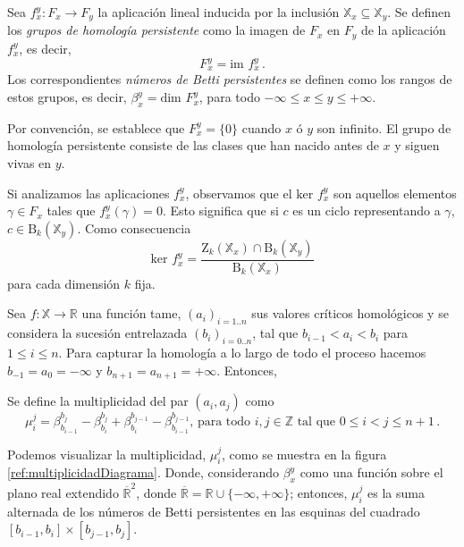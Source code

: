 \begin{definition}
Sea ${f_{x}^{y}: F_x \to F_y}$ la aplicación lineal inducida por la inclusión $\mathbb{X}_{x} \subseteq \mathbb{X}_{y}$. Se definen los \emph{grupos de homología persistente} como la imagen de $F_x$ en $F_y$ de la aplicación $f_{x}^{y}$, es decir,
\[
F_{x}^{y} = \text{im } f_{x}^{y}\,.
\]
Los correspondientes \emph{números de Betti persistentes} se definen como los rangos de estos grupos, es decir, $\beta_{x}^{y} = \text{dim } F_{x}^{y}$, para todo $-\infty \leq x \leq y \leq + \infty$. 
\end{definition}
Por convención, se establece que $F_{x}^{y}= \{0\}$ cuando $x$ ó $y$ son infinito. El grupo de homología persistente consiste de las clases que han nacido antes de $x$ y siguen vivas en $y$.


\begin{remark}
Si analizamos las aplicaciones $f_{x}^{y}$, observamos que el $\text{ker } f_{x}^{y}$ son aquellos elementos $\gamma \in F_x$ tales que $f_{x}^{y}(\gamma)=0$. Esto significa que si $c$ es un ciclo representando a $\gamma$, $c \in \text{B}_k(\mathbb{X}_y)$. Como consecuencia
\[
\text{ker } f_{x}^{y} = \dfrac{\text{Z}_k(\mathbb{X}_x) \cap \text{B}_k(\mathbb{X}_y)}{\text{B}_k(\mathbb{X}_x)}
\]
para cada dimensión $k$ fija. 
\end{remark}

Sea $f: \mathbb{X} \to \mathbb{R}$ una función tame, $(a_i)_{i=1..n}$ sus valores críticos homológicos y se considera la sucesión entrelazada $(b_i)_{i=0..n}$, tal que $b_{i-1} < a_{i} < b_{i}$ para $1 \leq i \leq n$. Para capturar la homología a lo largo de todo el proceso hacemos $b_{-1} = a_0 = -\infty$ y $b_{n+1} = a_{n+1} = +\infty$. Entonces,
\begin{definition}
Se define la multiplicidad del par $(a_i, a_j)$ como
\[
\mu_{i}^{j} = \beta_{b_{i-1}}^{b_j} - \beta_{b_i}^{b_j} +  \beta_{b_i}^{b_{j-1}} - \beta_{b_{i-1}}^{b_{j-1}} \text{, para todo } i, j \in \mathbb{Z} \text{ tal que } 0 \leq i < j \leq n+1\,.
\]
\end{definition}

\begin{sloppypar}
Podemos visualizar la multiplicidad, $\mu_{i}^{j}$, como se muestra en la figura \ref{ref:multiplicidadDiagrama}. Donde, considerando $\beta_{x}^{y}$ como una función sobre el plano real extendido $\overline{\mathbb{R}}^2$, donde ${\overline{\mathbb{R}} = \mathbb{R} \cup \{-\infty, +\infty\}}$; entonces, $\mu_{i}^{j}$ es la suma alternada de los números de Betti persistentes en las esquinas del cuadrado $[b_{i-1}, b_i]\times[b_{j-1}, b_j]$.
\end{sloppypar}

